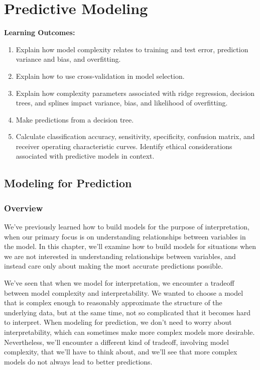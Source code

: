 \documentclass[
  letterpaper,
  DIV=11,
  numbers=noendperiod]{scrreprt}
\providecommand{\tightlist}{%
  \setlength{\itemsep}{0pt}\setlength{\parskip}{0pt}}\usepackage{longtable,booktabs,array}
\begin{document}

\chapter{Predictive Modeling}\label{predictive-modeling}

\textbf{Learning Outcomes:}

\begin{enumerate}
\def\labelenumi{\arabic{enumi}.}
\setcounter{enumi}{40}
\tightlist
\item
  Explain how model complexity relates to training and test error,
  prediction variance and bias, and overfitting.\\
\item
  Explain how to use cross-validation in model selection.\\
\item
  Explain how complexity parameters associated with ridge regression,
  decision trees, and splines impact variance, bias, and likelihood of
  overfitting.\\
\item
  Make predictions from a decision tree.\\
\item
  Calculate classification accuracy, sensitivity, specificity, confusion
  matrix, and receiver operating characteristic curves. Identify ethical
  considerations associated with predictive models in context.
\end{enumerate}

\section{Modeling for Prediction}\label{modeling-for-prediction}

\subsection{Overview}\label{overview}

We've previously learned how to build models for the purpose of
interpretation, when our primary focus is on understanding relationships
between variables in the model. In this chapter, we'll examine how to
build models for situations when we are not interested in understanding
relationships between variables, and instead care only about making the
most accurate predictions possible.

We've seen that when we model for interpretation, we encounter a
tradeoff between model complexity and interpretability. We wanted to
choose a model that is complex enough to reasonably approximate the
structure of the underlying data, but at the same time, not so
complicated that it becomes hard to interpret. When modeling for
prediction, we don't need to worry about interpretability, which can
sometimes make more complex models more desirable. Nevertheless, we'll
encounter a different kind of tradeoff, involving model complexity, that
we'll have to think about, and we'll see that more complex models do not
always lead to better predictions.
\end{document}
